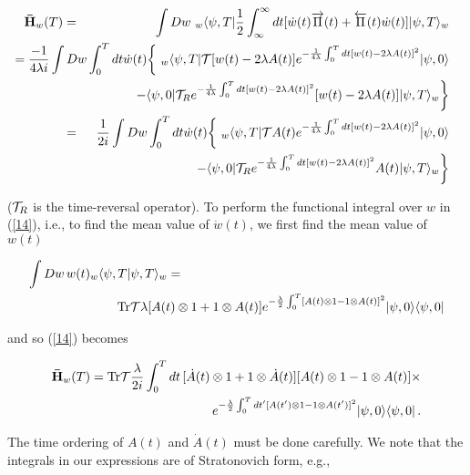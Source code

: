 \documentclass{article}
\begin{document}
\begin{eqnarray}\label{14}
{\bf \bar{H}}_{w}(T)
&=&\int Dw\ _{w}\langle \psi,T|\frac{1}{2}\int_{\infty}^{\infty}dt
[\dot{w}(t)\overrightarrow\Pi (t) + \overleftarrow\Pi (t)\dot{w}(t)]|\psi,T\rangle_{w}\nonumber\\
&&\!\!\!\!\!\!\!\!\!\!\!\!\!\!\!\!\!\!\!\!\!\!\!\!\!\!\!\!\!\!
\!\!\!\!\!=\frac{-1}{4\lambda i}\int Dw\int_{0}^{T}dt\dot{w}(t) 
\biggl\{\ _{w}\langle \psi,T|{\cal T}[w(t)-2\lambda A(t)]
e^{-\frac{1}{4\lambda}\int_{0}^{T}dt[w(t)-2\lambda A(t)]^{2}}|\psi,0\rangle\nonumber\\
&&\qquad - \langle \psi,0|{\cal T}_{R}
e^{-\frac{1}{4\lambda}\int_{0}^{T}dt[w(t)-2\lambda A(t)]^{2}}
[w(t)-2\lambda A(t)]|\psi,T\rangle_{w} \biggr\}\nonumber\\
&=&\frac{1}{2i}\int Dw\int_{0}^{T}dt\dot{w}(t) 
\biggl\{\ _{w}\langle \psi,T|{\cal T}A(t)
e^{-\frac{1}{4\lambda}\int_{0}^{T}dt[w(t)-2\lambda A(t)]^{2}}|\psi,0\rangle\nonumber\\
&&\qquad\qquad\qquad - \langle \psi,0|{\cal T}_{R}
e^{-\frac{1}{4\lambda}\int_{0}^{T}dt[w(t)-2\lambda A(t)]^{2}}
A(t)|\psi,T\rangle_{w} \biggr\}
\end{eqnarray} 

\noindent(${\cal T}_{R}$ is the time-reversal operator). 
To perform the functional integral over $w$ in (\ref{14}), i.e., to find the mean value of  $\dot{w}(t)$, 
we first find the mean value of ${w}(t)$ 

\begin{eqnarray*}
\int Dw\, w(t)_{w}\langle \psi,T|\psi,T\rangle_{w}&=&\\
&&\!\!\!\!\!\!\!\!\!\!\!\!\!\!\!\!\!\!\!\!\!\!\!\!\!\!\!\!\!\!\!\!\!\!\!\!{\rm Tr}{\cal T}\lambda 
[A(t)\otimes 1+1\otimes A(t)]e^
	{-\frac{\lambda}{2}\int_{0}^{T}[A(t)\otimes 1-1\otimes A(t)]^{2}}
	|\psi,0\rangle\langle \psi,0|
\end{eqnarray*}

\noindent and so (\ref{14}) becomes

\begin{eqnarray}\label{15}
{\bf \bar{H}}_{w}(T)={\rm Tr}{\cal T}\frac{\lambda}{2i}\int_{0}^{T}dt\,
[\dot{A}(t)\otimes 1+1\otimes \dot{A}(t)][A(t)\otimes 1-1\otimes A(t)]\times\nonumber\\
\qquad\qquad e^{-\frac{\lambda}{2}\int_{0}^{T}dt'[A(t')\otimes 1-1\otimes A(t')]^{2}}
	|\psi,0\rangle\langle \psi,0|\, .
\end{eqnarray}

\noindent The time ordering of $A(t)$ and $\dot{A}(t)$ must be done carefully. We note 
that the integrals in our expressions are of Stratonovich form, e.g.,
 
\end{document}
